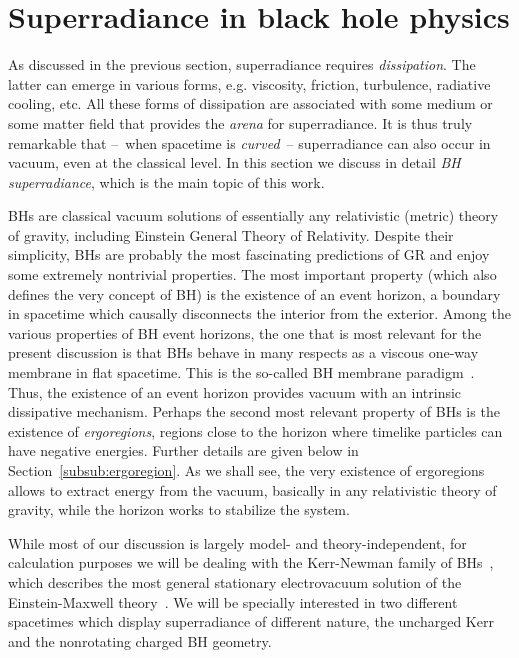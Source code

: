 \documentclass[11pt]{article}
\numberwithin{equation}{section} %
\begin{document}
\section{Superradiance in black hole physics}\label{sec:BHsuperradiance}
As discussed in the previous section, superradiance requires \emph{dissipation}. The latter can emerge in various forms, e.g. viscosity, friction, turbulence, radiative cooling, etc. All these forms of dissipation are associated with some medium or some matter field that provides the \emph{arena} for superradiance. It is thus truly remarkable that --~when spacetime is \emph{curved}~-- superradiance can also occur in vacuum, even at the classical level. In this section we discuss in detail \emph{BH superradiance}, which is the main topic of this work. 

BHs are classical vacuum solutions of essentially any relativistic (metric) theory of gravity, including Einstein General Theory of Relativity.
Despite their simplicity, BHs are probably the most fascinating predictions of GR and enjoy some extremely nontrivial 
properties. The most important property (which also defines the very concept of BH) is the existence of an event 
horizon, a boundary in spacetime which causally disconnects the interior from the exterior. Among 
the various properties of BH event horizons, the one that is most relevant for the present discussion is that BHs behave 
in many respects as a viscous one-way membrane in flat spacetime. This is the so-called BH membrane 
paradigm~\cite{MembraneParadigm}. Thus, the existence of an event horizon provides vacuum with an intrinsic dissipative 
mechanism. Perhaps the second most relevant property of BHs is the existence of {\it ergoregions}, regions close to the 
horizon where timelike particles can have negative energies. Further details are given below in 
Section~\ref{subsub:ergoregion}. As we shall see, the very existence of ergoregions allows to extract energy from the 
vacuum, basically in any relativistic theory of gravity, while the horizon works to stabilize the system.




While most of our discussion is largely model- and theory-independent, for calculation purposes we will be dealing with the Kerr-Newman family of BHs~\cite{Newman:1965my},
which describes the most general stationary electrovacuum solution of the Einstein-Maxwell theory~\cite{uniqueness}. We will be specially interested in two different spacetimes
which display superradiance of different nature, the uncharged Kerr and the nonrotating charged BH geometry.
\end{document}
